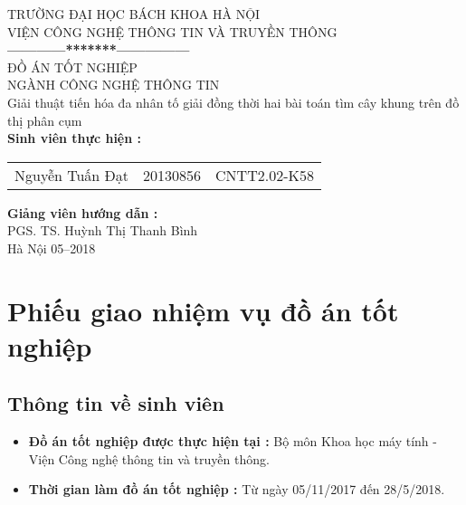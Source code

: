 \documentclass[a4paper,12pt]{report}
\begin{document}
\thispagestyle{empty}
\thisfancypage{
\setlength{\fboxrule}{1pt}
\doublebox}{}

\begin{center}
{\fontsize{16}{19}\selectfont TRƯỜNG ĐẠI HỌC BÁCH KHOA HÀ NỘI\\
VIỆN CÔNG NGHỆ THÔNG TIN VÀ TRUYỀN THÔNG}\\
\textbf{------------*******---------------}\\[1cm]

{\fontsize{23}{43}\selectfont ĐỒ ÁN TỐT NGHIỆP}\\[0.1cm]
{\fontsize{25}{10}\selectfont NGÀNH CÔNG NGHỆ THÔNG TIN}\\[0.9cm]
{\fontsize{20}{24}\selectfont Giải thuật tiến hóa đa nhân tố giải đồng thời hai bài toán tìm cây khung trên đồ thị phân cụm}\\[2.5cm]

\hspace{-6cm}\fontsize{14}{16}\selectfont \textbf{Sinh viên thực hiện :}\\[0.1cm] 
\begin{longtable}{l c c}
Nguyễn Tuấn Đạt & 20130856 & CNTT2.02-K58 
\end{longtable}
\vspace{0.3cm}
\hspace{-6cm}\fontsize{14}{16}\selectfont \textbf{Giảng viên hướng dẫn :}\\[0.1cm]
\hspace{-2.7cm}\fontsize{14}{16}\selectfont PGS. TS. Huỳnh Thị Thanh Bình \\[3cm]
\fontsize{16}{19}\selectfont Hà Nội 05--2018
\end{center}
\chapter*{Phiếu giao nhiệm vụ đồ án tốt nghiệp}
\section*{Thông tin về sinh viên}

\begin{itemize}
\item \textbf{Đồ án tốt nghiệp được thực hiện tại :} Bộ môn Khoa học máy tính - Viện Công nghệ thông tin và truyền thông.
\item \textbf{Thời gian làm đồ án tốt nghiệp : } Từ ngày 05/11/2017 đến 28/5/2018.
\end{itemize}
\end{document}
